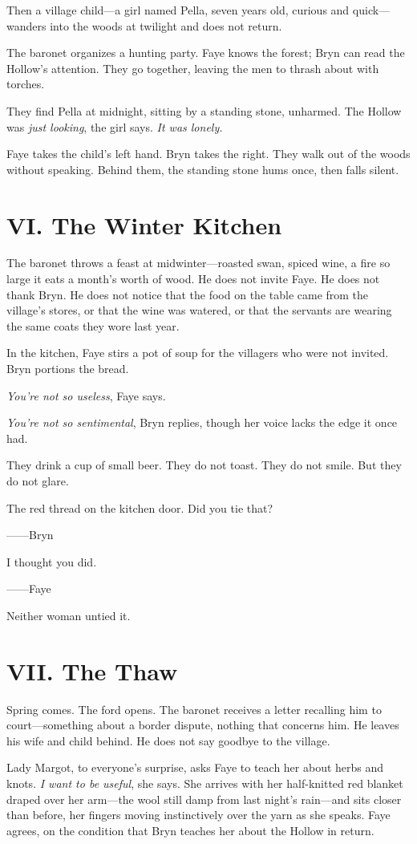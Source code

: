 \documentclass[11pt]{book}
\begin{document}
Then a village child---a girl named Pella, seven years old, curious and quick---wanders into the woods at twilight and does not return.

The baronet organizes a hunting party. Faye knows the forest; Bryn can read the Hollow's attention. They go together, leaving the men to thrash about with torches.

They find Pella at midnight, sitting by a standing stone, unharmed. The Hollow was \textit{just looking}, the girl says. \textit{It was lonely.}

Faye takes the child's left hand. Bryn takes the right. They walk out of the woods without speaking. Behind them, the standing stone hums once, then falls silent.

\section*{VI. The Winter Kitchen}
The baronet throws a feast at midwinter---roasted swan, spiced wine, a fire so large it eats a month's worth of wood. He does not invite Faye. He does not thank Bryn. He does not notice that the food on the table came from the village's stores, or that the wine was watered, or that the servants are wearing the same coats they wore last year.

In the kitchen, Faye stirs a pot of soup for the villagers who were not invited. Bryn portions the bread.

\textit{You're not so useless}, Faye says.

\textit{You're not so sentimental}, Bryn replies, though her voice lacks the edge it once had.

They drink a cup of small beer. They do not toast. They do not smile. But they do not glare.

\epigraph{The red thread on the kitchen door. Did you tie that?}{------Bryn}
\epigraph{I thought you did.}{------Faye}

Neither woman untied it.

\section*{VII. The Thaw}
Spring comes. The ford opens. The baronet receives a letter recalling him to court---something about a border dispute, nothing that concerns him. He leaves his wife and child behind. He does not say goodbye to the village.

Lady Margot, to everyone's surprise, asks Faye to teach her about herbs and knots. \textit{I want to be useful}, she says. She arrives with her half-knitted red blanket draped over her arm---the wool still damp from last night's rain---and sits closer than before, her fingers moving instinctively over the yarn as she speaks. Faye agrees, on the condition that Bryn teaches her about the Hollow in return.
\end{document}

